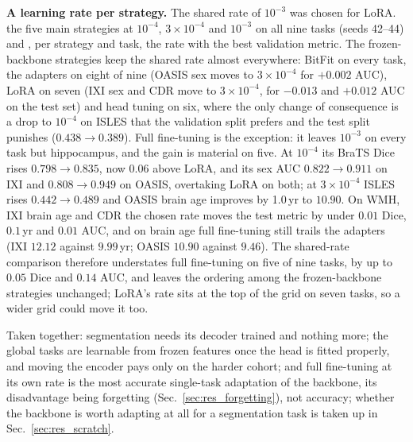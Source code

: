 \iffull\documentclass[journal]{IEEEtran}\else\documentclass[journal,twoside,web]{ieeecolor}\usepackage{generic}\fi
\begin{document}
\textbf{A learning rate per strategy.}\label{sec:res_lr} The shared rate of $10^{-3}$ was chosen for LoRA.  the five main strategies at $10^{-4}$, $3{\times}10^{-4}$ and $10^{-3}$ on all nine tasks (seeds 42--44) and , per strategy and task, the rate with the best validation metric. The frozen-backbone strategies keep the shared rate almost everywhere: BitFit on every task, the adapters on eight of nine (OASIS sex moves to $3{\times}10^{-4}$ for $+0.002$ AUC), LoRA on seven (IXI sex and CDR move to $3{\times}10^{-4}$, for $-0.013$ and $+0.012$ AUC on the test set) and head tuning on six, where the only change of consequence is a drop to $10^{-4}$ on ISLES that the validation split prefers and the test split punishes ($0.438\to0.389$). Full fine-tuning is the exception: it leaves $10^{-3}$ on every task but hippocampus, and the gain is material on five. At $10^{-4}$ its BraTS Dice rises $0.798\to0.835$, now $0.06$ above LoRA, and its sex AUC $0.822\to0.911$ on IXI and $0.808\to0.949$ on OASIS, overtaking LoRA on both; at $3{\times}10^{-4}$ ISLES rises $0.442\to0.489$ and OASIS brain age improves by 1.0\,yr to $10.90$. On WMH, IXI brain age and CDR the chosen rate moves the test metric by under $0.01$ Dice, $0.1$\,yr and $0.01$ AUC, and on brain age full fine-tuning still trails the adapters (IXI $12.12$ against $9.99$\,yr; OASIS $10.90$ against $9.46$). The shared-rate comparison therefore understates full fine-tuning on five of nine tasks, by up to $0.05$ Dice and $0.14$ AUC, and leaves the ordering among the frozen-backbone strategies unchanged; LoRA's rate sits at the top of the grid on seven tasks, so a wider grid could move it too.

Taken together: segmentation needs its decoder trained and nothing more; the global tasks are learnable from frozen features once the head is fitted properly, and moving the encoder pays only on the harder cohort; and full fine-tuning at its own rate is the most accurate single-task adaptation of the backbone, its disadvantage being forgetting (Sec.~\ref{sec:res_forgetting}), not accuracy; whether the backbone is worth adapting at all for a segmentation task is taken up in Sec.~\ref{sec:res_scratch}.
\end{document}
